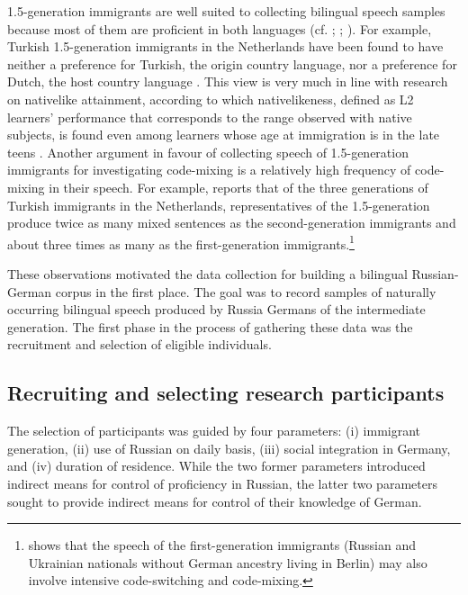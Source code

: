1.5-generation immigrants are well suited to collecting bilingual speech samples because most of them are proficient in both languages (cf. \citealt[43]{backus-patterns-1992}; \citealt[36--38]{halmari-government-1997}; \citealt[160--167]{boumans-syntax-1998}). For example, Turkish 1.5-gen\-er\-a\-tion immigrants in the Netherlands have been found to have neither a preference for Turkish, the origin country language, nor a preference for Dutch, the host country language \citep[201]{backus06}. This view is very much in line with research on nativelike attainment, according to which nativelikeness, defined as L2 learners' performance that corresponds to the range observed with native subjects, is found even among learners whose age at immigration is in the late teens \citep[121]{birdsong2009}. Another argument in favour of collecting speech of 1.5-generation immigrants for investigating code-mixing is a relatively high frequency of code-mixing in their speech. For example, \citet[][263]{backus1999} reports that of the three generations of Turkish immigrants in the Netherlands, representatives of the 1.5-generation produce twice as many mixed sentences as the second-generation immigrants and about three times as many as the first-generation immigrants.\footnote{\citet{goldbach05} shows that the speech of the first-generation immigrants (Russian and Ukrainian nationals without German ancestry living in Berlin) may also involve intensive code-switching and code-mixing.} 

These observations motivated the data collection for building a bilingual Rus\-sian-German corpus in the first place. The goal was to record samples of naturally occurring bilingual speech produced by Russia Germans of the intermediate generation. The first phase in the process of gathering these data was the recruitment and selection of  eligible individuals.

\subsection{Recruiting and selecting research participants}

The selection of participants was guided by four parameters: ({i}) immigrant generation, ({ii}) use of Russian on daily basis, ({iii}) social integration in Germany, and ({iv}) duration of residence. While the two former parameters introduced indirect means for control of proficiency in Russian, the latter two parameters sought to provide indirect means for control of their knowledge of German. 

